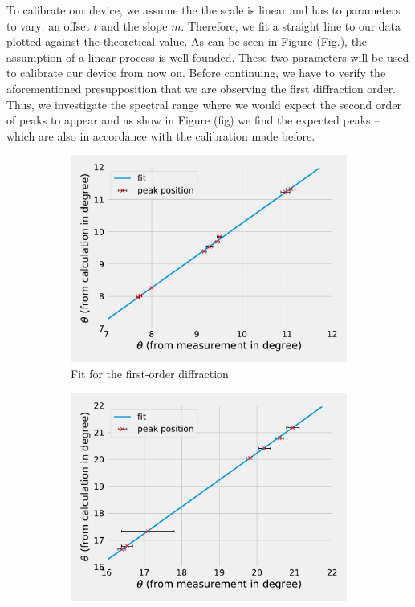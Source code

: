 To calibrate our device, we assume the the scale is linear and has to parameters to vary: an offset $t$ and the slope $m$. Therefore, we 
fit a straight line to our data plotted against the theoretical value. As can be seen in Figure (Fig.), the assumption of a linear process is well founded. 
These two parameters will be used to calibrate our device from now on. Before continuing, we have to verify the aforementioned presupposition that we are observing the first diffraction order.
Thus, we investigate the spectral range where we would expect the second order of peaks to appear and as show in Figure (fig) we find the expected peaks -- which are also in accordance with the calibration made before.

\begin{figure}[h]
    \centering
    \begin{subfigure}[b]{0.4\textwidth}
        \includegraphics[width =\textwidth]{Programming/Absorption/Eichung1ref.pdf}      
        \caption{Fit for the first-order diffraction}
      \label{fig:subfig1}
    \end{subfigure}
    \hspace{0.1\textwidth}
    \begin{subfigure}[b]{0.4\textwidth}
      \includegraphics[width = \textwidth]{Programming/Absorption/Eichung2ref.pdf}  

\end{subfigure}
\end{figure}
